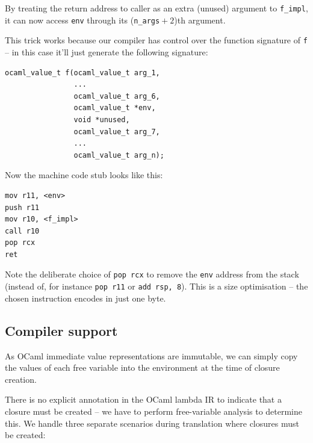 \documentclass[12pt,a4paper,twoside,openright]{report}
\begin{document}
By treating the return address to caller as an extra (unused) argument to
\lstinline!f_impl!, it can now access \lstinline!env! through its
(\lstinline{n_args}${}+2$)th argument.

This trick works because our compiler has control over the function signature
of \lstinline{f} -- in this case it'll just generate the following signature:

\begin{lstlisting}
ocaml_value_t f(ocaml_value_t arg_1,
                ...
                ocaml_value_t arg_6,
                ocaml_value_t *env,
                void *unused,
                ocaml_value_t arg_7,
                ...
                ocaml_value_t arg_n);
\end{lstlisting}

Now the machine code stub looks like this:

\begin{lstlisting}
mov r11, <env>
push r11
mov r10, <f_impl>
call r10
pop rcx
ret
\end{lstlisting}

Note the deliberate choice of \lstinline{pop rcx} to remove the
\lstinline{env} address from the stack (instead of, for instance
\lstinline{pop r11} or \lstinline{add rsp, 8}). This is a size optimisation --
the chosen instruction encodes in just one byte.

\subsection{Compiler support}\label{closures-compiler-support}

As OCaml immediate value representations are immutable, we can simply copy the
values of each free variable into the environment at the time of closure
creation.

There is no explicit annotation in the OCaml lambda IR to indicate that a
closure must be created -- we have to perform free-variable analysis
to determine this. We handle three separate scenarios during translation where
closures must be created:
\end{document}
